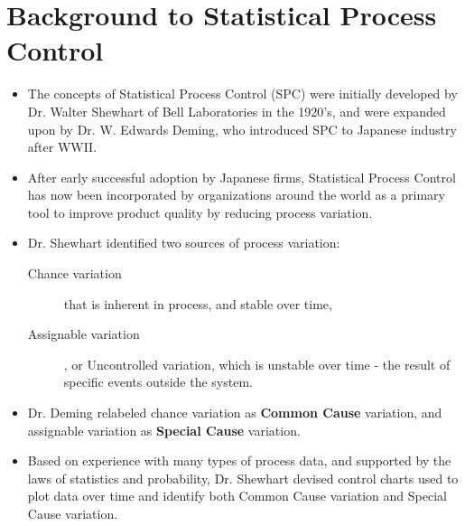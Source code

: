 \documentclass[]{report}
\begin{document}
\section{Background to  Statistical Process Control}
{
	\large
	\begin{itemize}
		\item The concepts of Statistical Process Control (SPC) were initially developed by Dr. Walter Shewhart of Bell Laboratories in the 1920's, and were expanded upon by Dr. W. Edwards Deming, who introduced SPC to Japanese industry after WWII.
		\item After early successful adoption by Japanese firms, Statistical Process Control has now been incorporated by organizations around the world as a primary tool to improve product quality by reducing process variation.
		\item Dr. Shewhart identified two sources of process variation: 
		\begin{description}
			\item[Chance variation] that is inherent in process, and stable over time, 
			\item[Assignable variation], or Uncontrolled variation, which is unstable over time - the result of specific events outside the system.
		\end{description}
		
		\item Dr. Deming relabeled chance variation as \textbf{Common Cause} variation, and assignable variation as \textbf{Special Cause} variation.
		\item Based on experience with many types of process data, and supported by the laws of statistics and probability, Dr. Shewhart devised control charts used to plot data over time and identify both Common Cause variation and Special Cause variation.
	\end{itemize}
}
%
%
%
\end{document}

